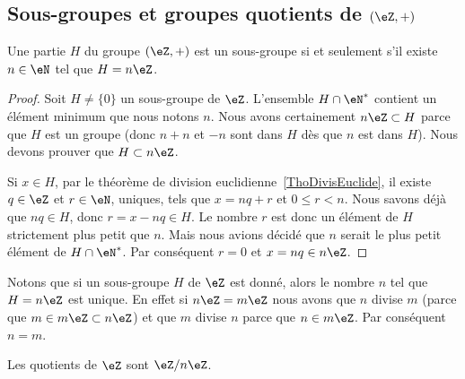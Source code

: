 


\subsection{Sous-groupes et groupes quotients de \texorpdfstring{$(\eZ,+)$}{(Z,+)}}

\begin{proposition} \label{PropSsgpZestnZ}
    Une partie \( H\) du groupe \( (\eZ,+)\) est un sous-groupe si et seulement s'il existe \( n\in\eN\) tel que \( H=n\eZ\).
\end{proposition}

\begin{proof}
    Soit \( H\neq\{ 0 \}\) un sous-groupe de \( \eZ\). L'ensemble \( H\cap\eN^*\) contient un élément minimum que nous notons \( n\). Nous avons certainement \( n\eZ\subset H\) parce que \( H\) est un groupe (donc \( n+n\) et \( -n\) sont dans \( H\) dès que \( n\) est dans \( H\)). Nous devons prouver que \( H\subset n\eZ\).

    Si \( x\in H\), par le théorème de division euclidienne~\ref{ThoDivisEuclide}, il existe \( q\in\eZ\) et \( r\in\eN \), uniques, tels que \( x=nq+r\) et \(0 \leq r < n \). Nous savons déjà que \( nq\in H\), donc \( r = x - nq \in H \). Le nombre \( r\) est donc un élément de \( H\) strictement plus petit que \( n\). Mais nous avions décidé que \( n\) serait le plus petit élément de \( H\cap\eN^*\). Par conséquent \( r=0\) et \( x=nq\in n\eZ\).
\end{proof}


Notons que si un sous-groupe \( H\) de \( \eZ\) est donné, alors le nombre \( n\) tel que \( H=n\eZ\) est unique. En effet si \( n\eZ=m\eZ\) nous avons que \( n\) divise \( m\) (parce que \( m\in m\eZ\subset n\eZ\)) et que \( m\) divise \( n\) parce que \( n\in m\eZ\). Par conséquent \( n=m\).


\begin{corollary}       \label{CORooLINXooBlUKPG}
    Les quotients de \( \eZ\) sont \( \eZ/n\eZ\).
\end{corollary}

